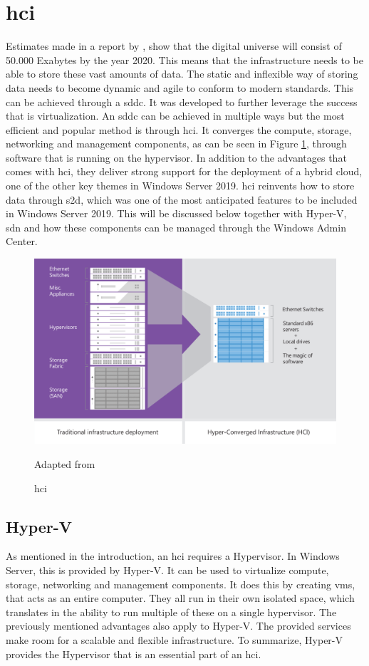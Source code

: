 \section{\acrfull{hci}}
Estimates made in a report by \textcite{Gantz2012}, show that the digital universe will consist of 50.000 Exabytes by the year 2020. This means that the infrastructure needs to be able to store these vast amounts of data. The static and inflexible way of storing data needs to become dynamic and agile to conform to modern standards. This can be achieved through a \acrfull{sddc}. It was developed to further leverage the success that is virtualization. An \acrshort{sddc} can be achieved in multiple ways but the most efficient and popular method is through \acrshort{hci}. It converges the compute, storage, networking and management components, as can be seen in Figure \ref{fig:HCI}, through software that is running on the hypervisor. In addition to the advantages that comes with \acrshort{hci}, they deliver strong support for the deployment of a hybrid cloud, one of the other key themes in Windows Server 2019. 
\acrshort{hci} reinvents how to store data through \acrshort{s2d}, which was one of the most anticipated features to be included in Windows Server 2019. This will be discussed below together with Hyper-V, \acrshort{sdn} and how these components can be managed through the Windows Admin Center. \autocite{Haag2016}
\begin{figure}[h]
	\includegraphics[width=0.8\linewidth]{img/StandVanZaken/HCI.png}
	\captionsetup{width=0.6\linewidth}
	\centering		
	\caption{\acrshort{hci}}
	\scriptsize	
	Adapted from \cite{Woolslayer2018}
	\label{fig:HCI}
\end{figure}

\subsection{Hyper-V}
As mentioned in the introduction, an \acrshort{hci} requires a Hypervisor. In Windows Server, this is provided by Hyper-V. It can be used to virtualize compute, storage, networking and management components.  It does this by creating \acrshort{vm}s, that acts as an entire computer. They all run in their own isolated space, which translates in the ability to run multiple of these on a single hypervisor. The previously mentioned advantages also apply to Hyper-V. The provided services make room for a scalable and flexible infrastructure. To summarize, Hyper-V provides the Hypervisor that is an essential part of an \acrshort{hci}. \autocite{Short2016}

